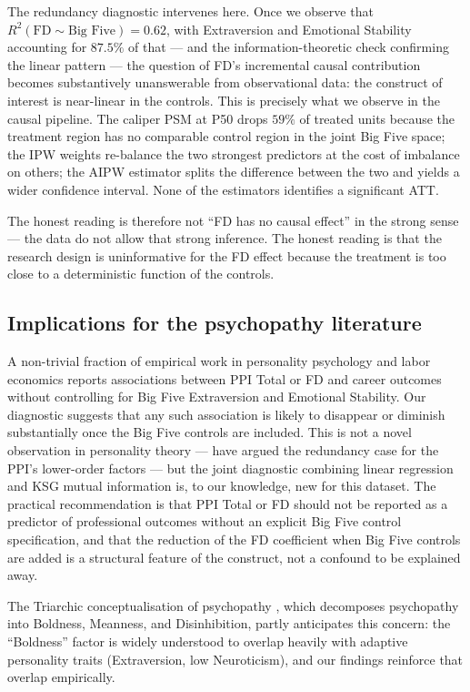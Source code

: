 \documentclass[11pt,a4paper]{article}
\begin{document}
The redundancy diagnostic intervenes here. Once we observe that
$R^2(\text{FD} \sim \text{Big Five}) = 0.62$, with Extraversion and
Emotional Stability accounting for $87.5\%$ of that --- and the
information-theoretic check confirming the linear pattern --- the
question of FD's incremental causal contribution becomes substantively
unanswerable from observational data: the construct of interest is
near-linear in the controls. This is precisely what we observe in
the causal pipeline. The caliper PSM at P50 drops $59\%$ of treated
units because the treatment region has no comparable control region
in the joint Big Five space; the IPW weights re-balance the two
strongest predictors at the cost of imbalance on others; the AIPW
estimator splits the difference between the two and yields a wider
confidence interval. None of the estimators identifies a
significant ATT.

The honest reading is therefore not ``FD has no causal effect'' in
the strong sense --- the data do not allow that strong inference.
The honest reading is that the research design is uninformative for
the FD effect because the treatment is too close to a deterministic
function of the controls.

\subsection{Implications for the psychopathy literature}

A non-trivial fraction of empirical work in personality psychology
and labor economics reports associations between PPI Total or FD and
career outcomes without controlling for Big Five Extraversion and
Emotional Stability. Our diagnostic suggests that any such association
is likely to disappear or diminish substantially once the Big Five
controls are included. This is not a novel observation in
personality theory --- \citet{miller2012} have argued the redundancy
case for the PPI's lower-order factors --- but the joint diagnostic
combining linear regression and KSG mutual information is, to our
knowledge, new for this dataset. The practical recommendation is that
PPI Total or FD should not be reported as a predictor of professional
outcomes without an explicit Big Five control specification, and that
the reduction of the FD coefficient when Big Five controls are added
is a structural feature of the construct, not a confound to be
explained away.

The Triarchic conceptualisation of psychopathy
\citep{patrick2009}, which decomposes psychopathy into Boldness,
Meanness, and Disinhibition, partly anticipates this concern: the
``Boldness'' factor is widely understood to overlap heavily with
adaptive personality traits (Extraversion, low Neuroticism), and our
findings reinforce that overlap empirically.
\end{document}
